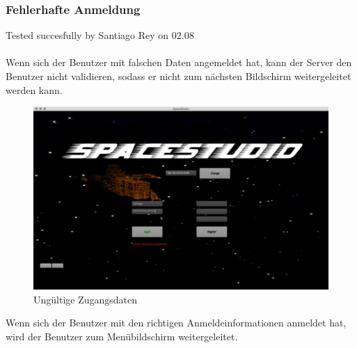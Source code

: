 \documentclass[12pt]{article}
\begin{document}
\subsubsection{Fehlerhafte Anmeldung}
Tested succesfully by Santiago Rey on 02.08\\\\
Wenn sich der Benutzer mit falschen Daten angemeldet hat, kann der Server den Benutzer nicht validieren, sodass er nicht zum nächsten Bildschirm weitergeleitet werden kann.
\begin{figure}[h]
\centering
\includegraphics[scale=0.4]{TestProtocolBilder/invalidCredentials.jpg}
\caption{Ungültige Zugangsdaten}
\end{figure}
\newpage
Wenn sich der Benutzer mit den richtigen Anmeldeinformationen anmeldet hat, wird der Benutzer zum Menübildschirm weitergeleitet.\\
\end{document}
